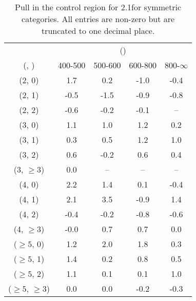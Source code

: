 \begin{table}[h!]
\tiny
\centering
\caption{Pull in the \gj control region for 2.1\ifb for symmetric categories. All entries are non-zero but are truncated to one decimal place.\label{tab:pullsepnaive_gj_ewk_sym}}
\begin{tabular}
{ccccc}
	\hline\hline
	& \multicolumn{4}{c}{\scalht (\gev)} \\ 
	 (\njet,  \nb) & 400-500 & 500-600 & 600-800 & 800-$\infty$ \\ [0.8ex] 
\hline
	(2, 0) & 1.7 & 0.2 & -1.0 & -0.4 \\[0.5ex] 
	(2, 1) & -0.5 & -1.5 & -0.9 & -0.8 \\[0.5ex] 
	(2, 2) & -0.6 & -0.2 & -0.1 & -- \\[0.5ex] 
	(3, 0) & 1.1 & 1.0 & 1.2 & 0.2 \\[0.5ex] 
	(3, 1) & 0.3 & 0.5 & 1.2 & 1.0 \\[0.5ex] 
	(3, 2) & 0.6 & -0.2 & 0.6 & 0.4 \\[0.5ex] 
	(3, $\ge3$) & 0.0 & -- & -- & -- \\[0.5ex] 
	(4, 0) & 2.2 & 1.4 & 0.1 & -0.4 \\[0.5ex] 
	(4, 1) & 2.1 & 3.5 & -0.9 & 1.4 \\[0.5ex] 
	(4, 2) & -0.4 & -0.2 & -0.8 & -0.6 \\[0.5ex] 
	(4, $\ge3$) & -0.0 & 0.7 & 0.7 & 0.0 \\[0.5ex] 
	($\ge5$, 0) & 1.2 & 2.0 & 1.8 & 0.3 \\[0.5ex] 
	($\ge5$, 1) & 1.4 & 0.2 & 0.8 & 0.5 \\[0.5ex] 
	($\ge5$, 2) & 1.1 & 0.1 & 0.1 & 1.0 \\[0.5ex] 
	($\ge5$, $\ge3$) & 0.0 & 0.0 & -0.2 & -0.3 \\[0.5ex] 
	\hline
	\hline
\end{tabular}
\end{table}
